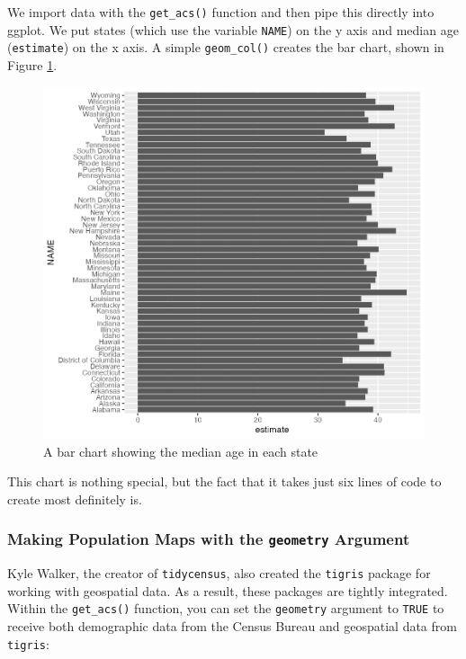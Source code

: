 \documentclass[
]{book}
\begin{document}
We import data with the \texttt{get\_acs()} function and then pipe this directly into ggplot. We put states (which use the variable \texttt{NAME}) on the y axis and median age (\texttt{estimate}) on the x axis. A simple \texttt{geom\_col()} creates the bar chart, shown in Figure \ref{fig:median-age-chart}.

\begin{figure}
\includegraphics[width=1\linewidth]{accessing-data_files/figure-latex/median-age-chart-1} \caption{A bar chart showing the median age in each state}\label{fig:median-age-chart}
\end{figure}

This chart is nothing special, but the fact that it takes just six lines of code to create most definitely is.

\hypertarget{making-population-maps-with-the-geometry-argument}{%
\subsubsection*{\texorpdfstring{Making Population Maps with the \texttt{geometry} Argument}{Making Population Maps with the geometry Argument}}\label{making-population-maps-with-the-geometry-argument}}

Kyle Walker, the creator of \texttt{tidycensus}, also created the \texttt{tigris} package for working with geospatial data. As a result, these packages are tightly integrated. Within the \texttt{get\_acs()} function, you can set the \texttt{geometry} argument to \texttt{TRUE} to receive both demographic data from the Census Bureau and geospatial data from \texttt{tigris}:
\end{document}
